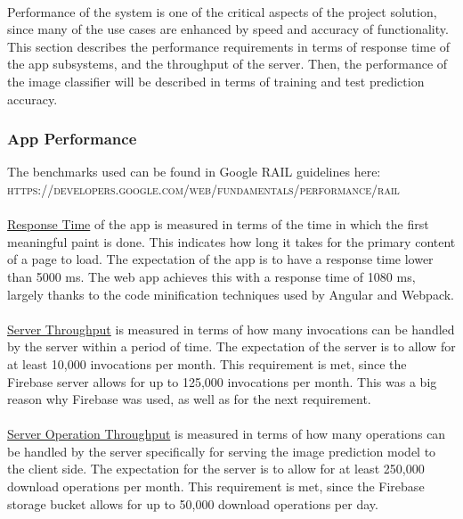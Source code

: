 \documentclass[a4paper, 11pt]{article}
\begin{document}
        \paragraph{}
    Performance of the system is one of the critical aspects of the project solution, since many of the use cases are enhanced by speed and accuracy of functionality. This section describes the performance requirements in terms of response time of the app subsystems, and the throughput of the server. Then, the performance of the image classifier will be described in terms of training and test prediction accuracy.

        \subsubsection{App Performance}
        The benchmarks used can be found in Google RAIL guidelines here:\\
        \textsc{https://developers.google.com/web/fundamentals/performance/rail}

            \paragraph{}
            \underline{Response Time} of the app is measured in terms of the time in which the first meaningful paint is done. This indicates how long it takes for the primary content of a page to load. The expectation of the app is to have a response time lower than 5000 ms. The web app achieves this with a response time of 1080 ms, largely thanks to the code minification techniques used by Angular and Webpack.
            
            \paragraph{}
            \underline{Server Throughput} is measured in terms of how many invocations can be handled by the server within a period of time. The expectation of the server is to allow for at least 10,000 invocations per month. This requirement is met, since the Firebase server allows for up to 125,000 invocations per month. This was a big reason why Firebase was used, as well as for the next requirement.
            
            \paragraph{}
            \underline{Server Operation Throughput} is measured in terms of how many operations can be handled by the server specifically for serving the image prediction model to the client side. The expectation for the server is to allow for at least 250,000 download operations per month. This requirement is met, since the Firebase storage bucket allows for up to 50,000 download operations per day.
            
\end{document}
